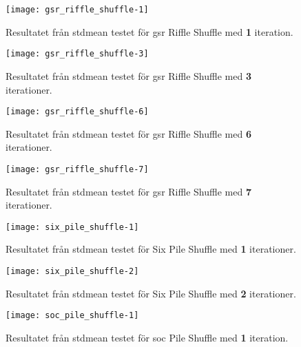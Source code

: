 \begin{figure}[H]
	\centering
	\texttt{[image: gsr\_riffle\_shuffle-1]}
	\captionsetup{width=0.5\textwidth}
	\caption{Resultatet från \gls{stdmean} testet  för \gls{gsr}
	Riffle Shuffle med \textbf{1} iteration.}
	\label{fig:gsr-1}
\end{figure}

\begin{figure}[H]
	\centering
	\texttt{[image: gsr\_riffle\_shuffle-3]} 
	\captionsetup{width=0.5\textwidth}
	\caption{Resultatet från \gls{stdmean} testet  för \gls{gsr}
	Riffle Shuffle med \textbf{3} iterationer.}
	\label{fig:gsr-3}
\end{figure}

\begin{figure}[H]
	\centering
	\texttt{[image: gsr\_riffle\_shuffle-6]} 
	\captionsetup{width=0.5\textwidth}
	\caption{Resultatet från \gls{stdmean} testet  för \gls{gsr} Riffle
	Shuffle med \textbf{6} iterationer.}
	\label{fig:gsr-6}
\end{figure}

\begin{figure}[H]
	\centering
	\texttt{[image: gsr\_riffle\_shuffle-7]} 
	\captionsetup{width=0.5\textwidth}
	\caption{Resultatet från \gls{stdmean} testet för \gls{gsr} Riffle Shuffle
	med \textbf{7} iterationer.}
	\label{fig:gsr-7}
\end{figure}

\begin{figure}[H]
	\centering
	\texttt{[image: six\_pile\_shuffle-1]} 
	\captionsetup{width=0.5\textwidth}
	\caption{Resultatet från \gls{stdmean} testet för Six Pile
	Shuffle med \textbf{1} iterationer.}
	\label{fig:six-1}
\end{figure}

\begin{figure}[H]
	\centering
	\texttt{[image: six\_pile\_shuffle-2]} 
	\captionsetup{width=0.5\textwidth}
	\caption{Resultatet från \gls{stdmean} testet för Six Pile
	Shuffle med \textbf{2} iterationer.}
	\label{fig:six-2}
\end{figure}

\begin{figure}[H]
	\centering
	\texttt{[image: soc\_pile\_shuffle-1]} 
	\captionsetup{width=0.5\textwidth}
	\caption{Resultatet från \gls{stdmean} testet för \gls{soc} Pile
	Shuffle med \textbf{1} iteration.}
	\label{fig:soc-1}
\end{figure}

